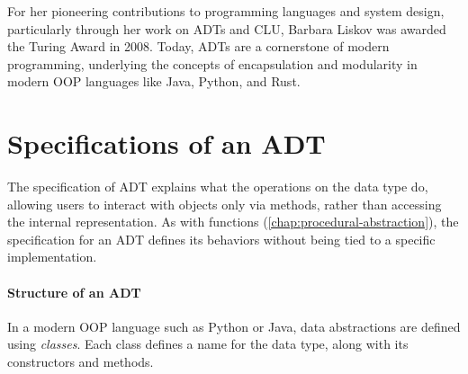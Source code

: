 \documentclass[oneside,11pt,dvipsnames]{book}
\begin{document}
For her pioneering contributions to programming languages and system design, particularly through her work on ADTs and CLU, Barbara Liskov was awarded the Turing Award in 2008. Today, ADTs are a cornerstone of modern programming, underlying the concepts of encapsulation and modularity in modern OOP languages like Java, Python, and Rust.







\section{Specifications of an ADT}

The specification of ADT explains what the operations on the data type do, allowing users to interact with objects only via methods, rather than accessing the internal representation. 
As with functions (\autoref{chap:procedural-abstraction}), the specification for an ADT defines its behaviors without being tied to a specific implementation.


\paragraph{Structure of an ADT} In a modern OOP language such as Python or Java, data abstractions are defined using \emph{classes}. Each class defines a name for the data type, along with its constructors and methods.
\end{document}

